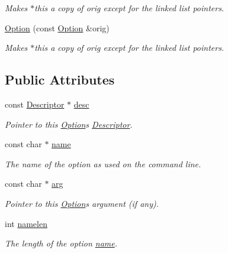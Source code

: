 \begin{DoxyCompactItemize}
\begin{DoxyCompactList}\small\item\em Makes {\ttfamily $\ast$this} a copy of {\ttfamily orig} except for the linked list pointers. \end{DoxyCompactList}\item 
\hyperlink{classoption_1_1_option_a4053240fecad1a3b1d8e4dc06b7aa8c4}{Option} (const \hyperlink{classoption_1_1_option}{Option} \&orig)
\begin{DoxyCompactList}\small\item\em Makes {\ttfamily $\ast$this} a copy of {\ttfamily orig} except for the linked list pointers. \end{DoxyCompactList}\end{DoxyCompactItemize}
\subsection*{Public Attributes}
\begin{DoxyCompactItemize}
\item 
const \hyperlink{structoption_1_1_descriptor}{Descriptor} $\ast$ \hyperlink{classoption_1_1_option_af8d664a7b5de1425008b1812a90a0c23}{desc}
\begin{DoxyCompactList}\small\item\em Pointer to this \hyperlink{classoption_1_1_option}{Option}\textquotesingle{}s \hyperlink{structoption_1_1_descriptor}{Descriptor}. \end{DoxyCompactList}\item 
const char $\ast$ \hyperlink{classoption_1_1_option_a02a76b4896abd22d0ba8514362261de9}{name}
\begin{DoxyCompactList}\small\item\em The name of the option as used on the command line. \end{DoxyCompactList}\item 
const char $\ast$ \hyperlink{classoption_1_1_option_a402be734987458364b0f473acae36238}{arg}
\begin{DoxyCompactList}\small\item\em Pointer to this \hyperlink{classoption_1_1_option}{Option}\textquotesingle{}s argument (if any). \end{DoxyCompactList}\item 
int \hyperlink{classoption_1_1_option_a3aa2957b19ad5815873441b415d56050}{namelen}
\begin{DoxyCompactList}\small\item\em The length of the option \hyperlink{classoption_1_1_option_a02a76b4896abd22d0ba8514362261de9}{name}. \end{DoxyCompactList}\end{DoxyCompactItemize}



